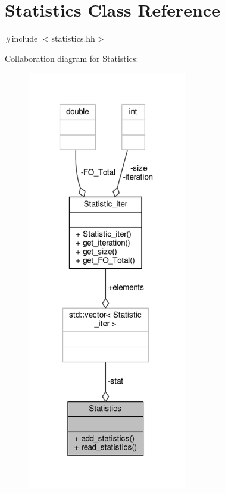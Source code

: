 \hypertarget{classStatistics}{\section{Statistics Class Reference}
\label{classStatistics}
}


{\ttfamily \#include $<$statistics.\-hh$>$}



Collaboration diagram for Statistics\-:
\nopagebreak
\begin{figure}[H]
\begin{center}
\leavevmode
\includegraphics[width=197pt]{classStatistics__coll__graph}
\end{center}
\end{figure}
